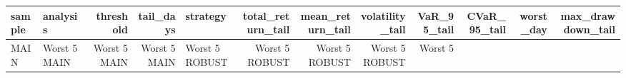 \begin{tabular}{llrrlrrrrrrr}
\toprule
sample & analysis & threshold & tail_days & strategy & total_return_tail & mean_return_tail & volatility_tail & VaR_95_tail & CVaR_95_tail & worst_day & max_drawdown_tail \\
\midrule
MAIN & Worst 5%
MAIN & Worst 5%
MAIN & Worst 5%
MAIN & Worst 5%
ROBUST & Worst 5%
ROBUST & Worst 5%
ROBUST & Worst 5%
ROBUST & Worst 5%
\bottomrule
\end{tabular}

